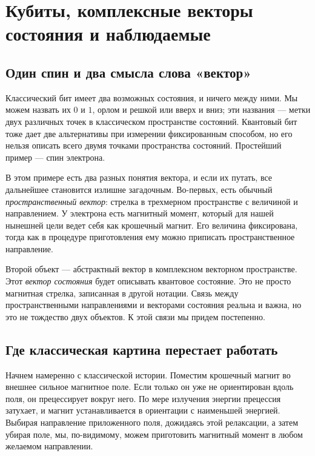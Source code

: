 \chapter{Кубиты, комплексные векторы состояния и наблюдаемые}


\section{Один спин и два смысла слова «вектор»}

Классический бит имеет два возможных состояния, и ничего между ними. Мы можем назвать их \(0\) и \(1\), орлом и решкой или вверх и вниз; эти названия — метки двух различных точек в классическом пространстве состояний. Квантовый бит тоже дает две альтернативы при измерении фиксированным способом, но его нельзя описать всего двумя точками пространства состояний. Простейший пример — спин электрона.

В этом примере есть два разных понятия вектора, и если их путать, все дальнейшее становится излишне загадочным. Во-первых, есть обычный \emph{пространственный вектор}: стрелка в трехмерном пространстве с величиной и направлением. У электрона есть магнитный момент, который для нашей нынешней цели ведет себя как крошечный магнит. Его величина фиксирована, тогда как в процедуре приготовления ему можно приписать пространственное направление.

Второй объект — абстрактный вектор в комплексном векторном пространстве. Этот \emph{вектор состояния} будет описывать квантовое состояние. Это не просто магнитная стрелка, записанная в другой нотации. Связь между пространственными направлениями и векторами состояния реальна и важна, но это не тождество двух объектов. К этой связи мы придем постепенно.

\section{Где классическая картина перестает работать}

Начнем намеренно с классической истории. Поместим крошечный магнит во внешнее сильное магнитное поле. Если только он уже не ориентирован вдоль поля, он прецессирует вокруг него. По мере излучения энергии прецессия затухает, и магнит устанавливается в ориентации с наименьшей энергией. Выбирая направление приложенного поля, дожидаясь этой релаксации, а затем убирая поле, мы, по-видимому, можем приготовить магнитный момент в любом желаемом направлении.

